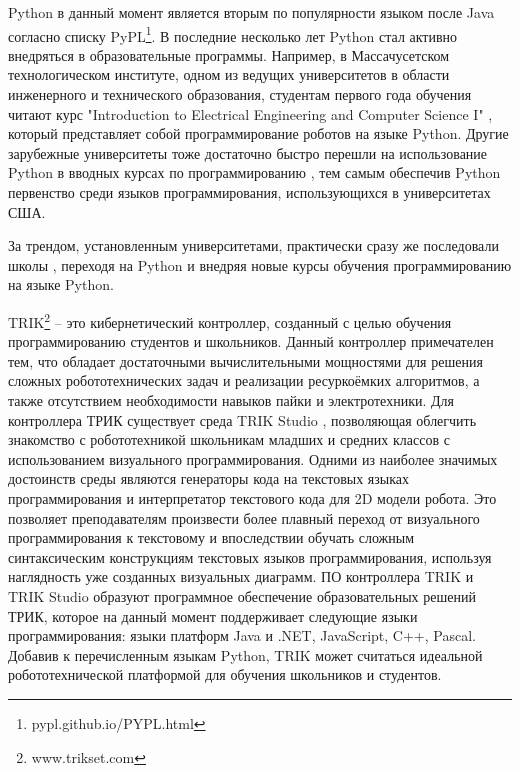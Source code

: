 \documentclass[14pt]{matmex-diploma-custom}
\begin{document}
Python в данный момент является вторым по популярности языком после Java согласно списку PyPL\footnote{pypl.github.io/PYPL.html}. В последние несколько лет Python стал активно внедряться в образовательные программы. Например, в Массачусетском технологическом институте, одном из ведущих университетов в области инженерного и технического образования, студентам первого года обучения читают курс "Introduction to Electrical Engineering and Computer Science I" \cite{stemMITCourse}, который представляет собой программирование роботов на языке Python. Другие зарубежные университеты тоже достаточно быстро перешли на использование Python в вводных курсах по программированию \cite{pythonUni}, тем самым обеспечив Python первенство среди языков программирования, использующихся в университетах США.

За трендом, установленным университетами, практически сразу же последовали школы \cite{stemSecCourse, stemSchool}, переходя на Python и внедряя новые курсы обучения программированию на языке Python.

TRIK\footnote{www.trikset.com} -- это кибернетический контроллер, созданный с целью обучения программированию студентов и школьников. Данный контроллер примечателен тем, что обладает достаточными вычислительными мощностями для решения сложных робототехнических задач и реализации ресуркоёмких алгоритмов, а также отсутствием необходимости навыков пайки и электротехники. Для контроллера ТРИК существует среда TRIK Studio \cite{qrealRobots, TRIKStudioTech}, позволяющая облегчить знакомство с робототехникой школьникам младших и средних классов с использованием визуального программирования. Одними из наиболее значимых достоинств среды являются генераторы кода на текстовых языках программирования и интерпретатор текстового кода для 2D модели робота. Это позволяет преподавателям произвести более плавный переход от визуального программирования к текстовому и впоследствии обучать сложным синтаксическим конструкциям текстовых языков программирования, используя наглядность уже созданных визуальных диаграмм. ПО контроллера TRIK и TRIK Studio образуют программное обеспечение образовательных решений ТРИК, которое на данный момент поддерживает следующие языки программирования: языки платформ Java и .NET, JavaScript, C++, Pascal. Добавив к перечисленным языкам Python, TRIK может считаться идеальной робототехнической платформой для обучения школьников и студентов.
\end{document}
